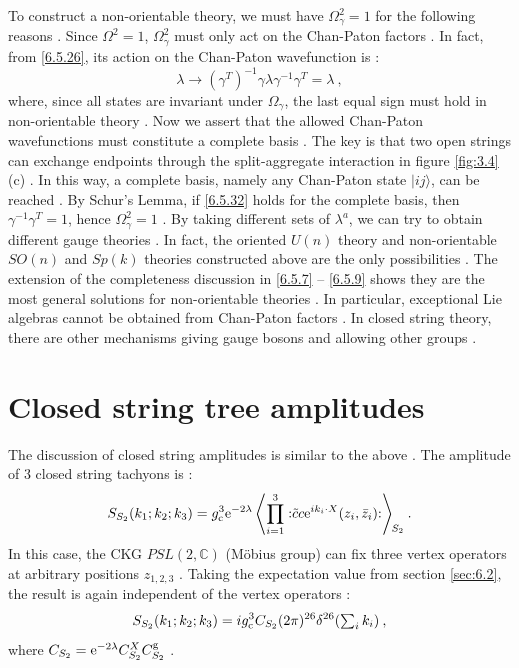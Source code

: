 To construct a non-orientable theory, we must have $\Omega_{\gamma}^{2}=1$ for the following reasons . Since $\Omega^{2}=1$, $\Omega_{\gamma}^{2}$ must only act on the Chan-Paton factors . In fact, from \eqref{6.5.26}, its action on the Chan-Paton wavefunction is :
\begin{equation}
	\lambda \rightarrow (\gamma^{T})^{-1} \gamma \lambda \gamma^{-1} \gamma^{T}=\lambda \:, \label{6.5.32}
\end{equation}
where, since all states are invariant under $\Omega_{\gamma}$, the last equal sign must hold in non-orientable theory . Now we assert that the allowed Chan-Paton wavefunctions must constitute a complete basis . The key is that two open strings can exchange endpoints through the split-aggregate interaction in figure \ref{fig:3.4}(c) . In this way, a complete basis, namely any Chan-Paton state $|i j\rangle$, can be reached . By Schur's Lemma, if \eqref{6.5.32} holds for the complete basis, then $\gamma^{-1} \gamma^{T}=1$, hence $\Omega_{\gamma}^{2}=1$ . By taking different sets of $\lambda^{a}$, we can try to obtain different gauge theories . In fact, the oriented $U(n)$ theory and non-orientable $SO(n)$ and $Sp(k)$ theories constructed above are the only possibilities . The extension of the completeness discussion in \eqref{6.5.7} -- \eqref{6.5.9} shows they are the most general solutions for non-orientable theories . In particular, exceptional Lie algebras cannot be obtained from Chan-Paton factors . In closed string theory, there are other mechanisms giving gauge bosons and allowing other groups .

\section{Closed string tree amplitudes} \label{sec:6.6}

The discussion of closed string amplitudes is similar to the above . The amplitude of 3 closed string tachyons is :
\begin{equation}
	S_{S_{2}}(k_{1} ; k_{2} ; k_{3})=g_{\mathrm{c}}^{3} \mathrm{e}^{-2 \lambda}\left\langle\prod_{i=1}^{3} : \mathrel{\tilde{c} c \mathrm{e}^{i k_{i} \cdot X}(z_{i}, \bar{z}_{i})}:\right\rangle \bigg._{\!\!S_{2}} \:. \label{6.6.1}
\end{equation}
In this case, the CKG $PSL(2, \mathds{C})$ (Möbius group) can fix three vertex operators at arbitrary positions $z_{1,2,3}$ . Taking the expectation value from section \ref{sec:6.2}, the result is again independent of the vertex operators :
\begin{equation}
	S_{S_{2}}(k_{1} ; k_{2} ; k_{3})= i g_{\mathrm{c}}^{3} C_{S_{2}}(2 \pi)^{26} \delta^{26}({\textstyle \sum_{i} k_{i}}) \:, \label{6.6.2}
\end{equation}
where $C_{S_{2}}=\mathrm{e}^{-2 \lambda} C_{S_{2}}^{X} C_{S_{2}}^{\mathrm{g}}$ .

